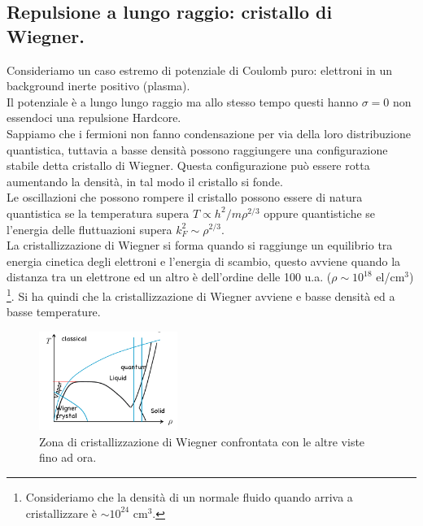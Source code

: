 \subsection{Repulsione a lungo raggio: cristallo di Wiegner.}
\label{subsec:Repulsione a lungo raggio: cristallo di Wiegner.}
Consideriamo un caso estremo di potenziale di Coulomb puro: elettroni in un background inerte positivo (plasma).\\
Il potenziale è a lungo lungo raggio ma allo stesso tempo questi hanno $\sigma=0$ non essendoci una repulsione Hardcore.\\
Sappiamo che i fermioni non fanno condensazione per via della loro distribuzione quantistica, tuttavia a basse densità possono raggiungere una configurazione stabile detta cristallo di Wiegner. Questa configurazione può essere rotta aumentando la densità, in tal modo il cristallo si fonde.\\
Le oscillazioni che possono rompere il cristallo possono essere di natura quantistica se la temperatura supera $T\propto h^2 /m\rho ^{2/3}$ oppure quantistiche se l'energia delle fluttuazioni supera $k_F^2\sim\rho ^{2/3}$.\\
La cristallizzazione di Wiegner si forma quando si raggiunge un equilibrio tra energia cinetica degli elettroni e l'energia di scambio, questo avviene quando la distanza tra un elettrone ed un altro è dell'ordine delle 100 u.a. ($\rho \sim 10^{18}$ el/cm$^3$) \footnote{Consideriamo che la densità di un normale fluido quando arriva a cristallizzare è $\sim 10^{24}$ cm$^3$.}.
Si ha quindi che la cristallizzazione di Wiegner avviene e basse densità ed a basse temperature.
\begin{figure}[ht]
	\centering
	\includegraphics[width=0.4\textwidth]{figures/cristallo-Wiegner.png}
	\caption{Zona di cristallizzazione di Wiegner confrontata con le altre viste fino ad ora.}
	\label{fig:figures-cristallo-Wiegner-png}
\end{figure}
